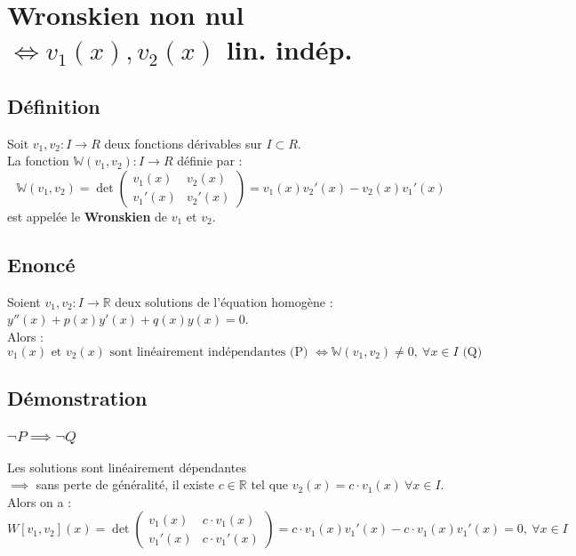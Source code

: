 \documentclass{article}
\begin{document}
\newpage

\section{Wronskien non nul $\Leftrightarrow v_1(x), v_2(x) $ lin. indép.}

\subsection{Définition}

Soit $ v_1, v_2 : I \to R $ deux fonctions dérivables sur $ I \subset R $.\\
La fonction $ \mathbb{W}(v_1, v_2) : I \to R $ définie par :
\[ \mathbb{W}(v_1, v_2) = \det\begin{pmatrix}
v_1(x) & v_2(x)\\
v_1'(x) & v_2'(x)
\end{pmatrix} = v_1(x)v_2'(x) - v_2(x)v_1'(x) \]
est appelée le \textbf{Wronskien} de $ v_1 $ et $ v_2 $.

\subsection{Enoncé}

Soient $ v_1, v_2 : I \to \mathbb{R} $ deux solutions de l'équation homogène : $ y''(x) + p(x)y'(x) + q(x)y(x) = 0 $.\\
Alors :
\[ v_1(x) \text{ et } v_2(x) \text{ sont linéairement indépendantes (P) } \Leftrightarrow \mathbb{W}(v_1, v_2) \neq 0,\ \forall x \in I \text{ (Q) }\]

\subsection{Démonstration}

\subsubsection{$ \neg P \implies \neg Q $}

Les solutions sont linéairement dépendantes\\
$ \implies $ sans perte de généralité, il existe $ c \in \mathbb{R} $ tel que $ v_2(x) = c \cdot v_1(x)\ \forall x \in I $.\\Alors on a :
\[ W[v_1, v_2](x) = \det\begin{pmatrix}
v_1(x) & c\cdot{v_1(x)}\\
v_1'(x) & c\cdot{v_1'(x)}
\end{pmatrix} = c\cdot{v_1(x)}v_1'(x) - c\cdot{v_1(x)}v_1'(x) = 0,\ \forall x \in I \]
\end{document}
